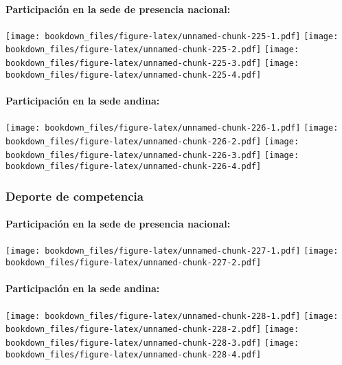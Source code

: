 \documentclass[]{article}
\let\oldparagraph\paragraph
\renewcommand{\paragraph}[1]{\oldparagraph{#1}\mbox{}}
\theoremstyle{definition}
\theoremstyle{definition}
\theoremstyle{definition}
\theoremstyle{remark}
\begin{document}
\paragraph{Participación en la sede de presencia
nacional:}\label{participacion-en-la-sede-de-presencia-nacional-29}

\texttt{[image: bookdown\_files/figure-latex/unnamed-chunk-225-1.pdf]}
\texttt{[image: bookdown\_files/figure-latex/unnamed-chunk-225-2.pdf]}
\texttt{[image: bookdown\_files/figure-latex/unnamed-chunk-225-3.pdf]}
\texttt{[image: bookdown\_files/figure-latex/unnamed-chunk-225-4.pdf]}

\paragraph{Participación en la sede
andina:}\label{participacion-en-la-sede-andina-29}

\texttt{[image: bookdown\_files/figure-latex/unnamed-chunk-226-1.pdf]}
\texttt{[image: bookdown\_files/figure-latex/unnamed-chunk-226-2.pdf]}
\texttt{[image: bookdown\_files/figure-latex/unnamed-chunk-226-3.pdf]}
\texttt{[image: bookdown\_files/figure-latex/unnamed-chunk-226-4.pdf]}

\subsubsection{Deporte de competencia}\label{deporte-de-competencia-1}

\paragraph{Participación en la sede de presencia
nacional:}\label{participacion-en-la-sede-de-presencia-nacional-30}

\texttt{[image: bookdown\_files/figure-latex/unnamed-chunk-227-1.pdf]}
\texttt{[image: bookdown\_files/figure-latex/unnamed-chunk-227-2.pdf]}

\paragraph{Participación en la sede
andina:}\label{participacion-en-la-sede-andina-30}

\texttt{[image: bookdown\_files/figure-latex/unnamed-chunk-228-1.pdf]}
\texttt{[image: bookdown\_files/figure-latex/unnamed-chunk-228-2.pdf]}
\texttt{[image: bookdown\_files/figure-latex/unnamed-chunk-228-3.pdf]}
\texttt{[image: bookdown\_files/figure-latex/unnamed-chunk-228-4.pdf]}
\end{document}
